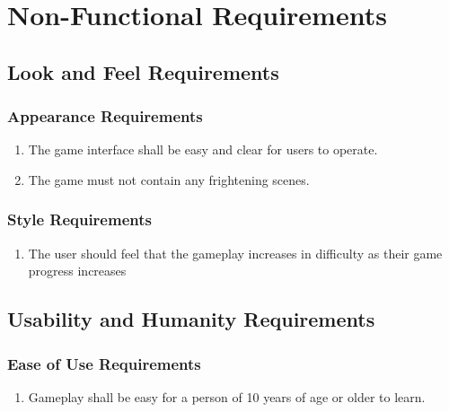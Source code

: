 \documentclass[12pt, titlepage]{article}
\begin{document}
\section{Non-Functional Requirements}
\label{sec:non-functional_requirements}
\subsection{Look and Feel Requirements}
\label{sub:look_and_feel_requirements}

\subsubsection{Appearance Requirements}
\label{ssub:appearance_requirements}
\begin{enumerate}[{LF}1. ]
	\item The game interface shall be easy and clear for users to operate.
	\item The game must not contain any frightening scenes.
\end{enumerate}

\subsubsection{Style Requirements}
\label{ssub:style_requirements}
\begin{enumerate}[{LF}3. ]
	\item The user should feel that the gameplay increases in difficulty as their game progress increases
\end{enumerate}


\subsection{Usability and Humanity Requirements}
\label{sub:usability_and_humanity_requirements}

\subsubsection{Ease of Use Requirements}
\label{ssub:ease_of_use_requirements}
\begin{enumerate}[start=1,label={ UH\arabic*.}]
	\item Gameplay shall be easy for a person of 10 years of age or older to learn.
\end{enumerate}
\end{document}
